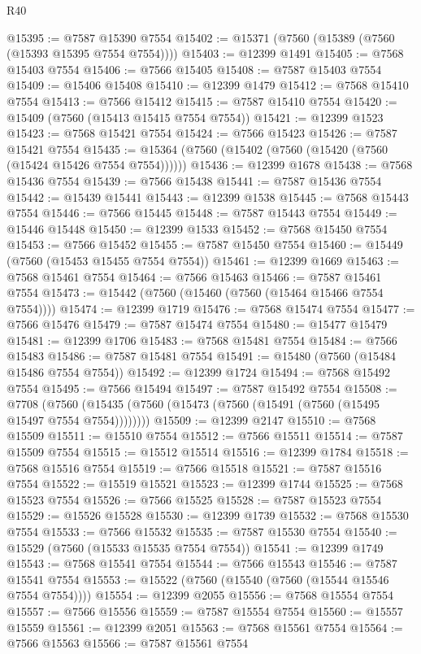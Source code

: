 \begin{lexlean}{R40}
\begin{coremodule}
@15395 := @7587 @15390 @7554
@15402 := @15371 (@7560 (@15389 (@7560 (@15393 @15395 @7554 @7554))))
@15403 := @12399 @1491
@15405 := @7568 @15403 @7554
@15406 := @7566 @15405
@15408 := @7587 @15403 @7554
@15409 := @15406 @15408
@15410 := @12399 @1479
@15412 := @7568 @15410 @7554
@15413 := @7566 @15412
@15415 := @7587 @15410 @7554
@15420 := @15409 (@7560 (@15413 @15415 @7554 @7554))
@15421 := @12399 @1523
@15423 := @7568 @15421 @7554
@15424 := @7566 @15423
@15426 := @7587 @15421 @7554
@15435 := @15364 (@7560 (@15402 (@7560 (@15420 (@7560 (@15424 @15426 @7554 @7554))))))
@15436 := @12399 @1678
@15438 := @7568 @15436 @7554
@15439 := @7566 @15438
@15441 := @7587 @15436 @7554
@15442 := @15439 @15441
@15443 := @12399 @1538
@15445 := @7568 @15443 @7554
@15446 := @7566 @15445
@15448 := @7587 @15443 @7554
@15449 := @15446 @15448
@15450 := @12399 @1533
@15452 := @7568 @15450 @7554
@15453 := @7566 @15452
@15455 := @7587 @15450 @7554
@15460 := @15449 (@7560 (@15453 @15455 @7554 @7554))
@15461 := @12399 @1669
@15463 := @7568 @15461 @7554
@15464 := @7566 @15463
@15466 := @7587 @15461 @7554
@15473 := @15442 (@7560 (@15460 (@7560 (@15464 @15466 @7554 @7554))))
@15474 := @12399 @1719
@15476 := @7568 @15474 @7554
@15477 := @7566 @15476
@15479 := @7587 @15474 @7554
@15480 := @15477 @15479
@15481 := @12399 @1706
@15483 := @7568 @15481 @7554
@15484 := @7566 @15483
@15486 := @7587 @15481 @7554
@15491 := @15480 (@7560 (@15484 @15486 @7554 @7554))
@15492 := @12399 @1724
@15494 := @7568 @15492 @7554
@15495 := @7566 @15494
@15497 := @7587 @15492 @7554
@15508 := @7708
    (@7560 (@15435 (@7560 (@15473 (@7560 (@15491 (@7560 (@15495 @15497 @7554 @7554))))))))
@15509 := @12399 @2147
@15510 := @7568 @15509
@15511 := @15510 @7554
@15512 := @7566 @15511
@15514 := @7587 @15509 @7554
@15515 := @15512 @15514
@15516 := @12399 @1784
@15518 := @7568 @15516 @7554
@15519 := @7566 @15518
@15521 := @7587 @15516 @7554
@15522 := @15519 @15521
@15523 := @12399 @1744
@15525 := @7568 @15523 @7554
@15526 := @7566 @15525
@15528 := @7587 @15523 @7554
@15529 := @15526 @15528
@15530 := @12399 @1739
@15532 := @7568 @15530 @7554
@15533 := @7566 @15532
@15535 := @7587 @15530 @7554
@15540 := @15529 (@7560 (@15533 @15535 @7554 @7554))
@15541 := @12399 @1749
@15543 := @7568 @15541 @7554
@15544 := @7566 @15543
@15546 := @7587 @15541 @7554
@15553 := @15522 (@7560 (@15540 (@7560 (@15544 @15546 @7554 @7554))))
@15554 := @12399 @2055
@15556 := @7568 @15554 @7554
@15557 := @7566 @15556
@15559 := @7587 @15554 @7554
@15560 := @15557 @15559
@15561 := @12399 @2051
@15563 := @7568 @15561 @7554
@15564 := @7566 @15563
@15566 := @7587 @15561 @7554

\end{coremodule}
\end{lexlean}
